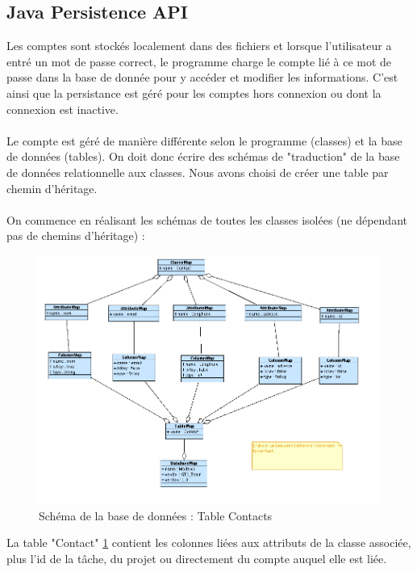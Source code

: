 	\subsection{Java Persistence API}
	
	Les comptes sont stockés localement dans des fichiers et lorsque l'utilisateur a entré un mot de passe correct, le programme charge le compte lié à ce mot de passe dans la base de donnée pour y accéder et modifier les informations. C'est ainsi que la persistance est géré pour les comptes hors connexion ou dont la connexion est inactive.
	\paragraph*{}
	Le compte est géré de manière différente selon le programme (classes) et la base de données (tables). On doit donc écrire des schémas de "traduction" de la base de données relationnelle aux classes. Nous avons choisi de créer une table par chemin d'héritage.
	\paragraph*{}
	On commence en réalisant les schémas de toutes les classes isolées (ne dépendant pas de chemins d'héritage) :\\

	\begin{figure}[htbp]

		\includegraphics[width=18cm]{images/L4/ContactDBS.png}
	\caption{Schéma de la base de données : Table Contacts}
	\label{ContactDBS}
\end{figure}
La table "Contact" \ref{ContactDBS} contient les colonnes liées aux attributs de la classe associée, plus l'id de la tâche, du projet ou directement du compte auquel elle est liée. \\


